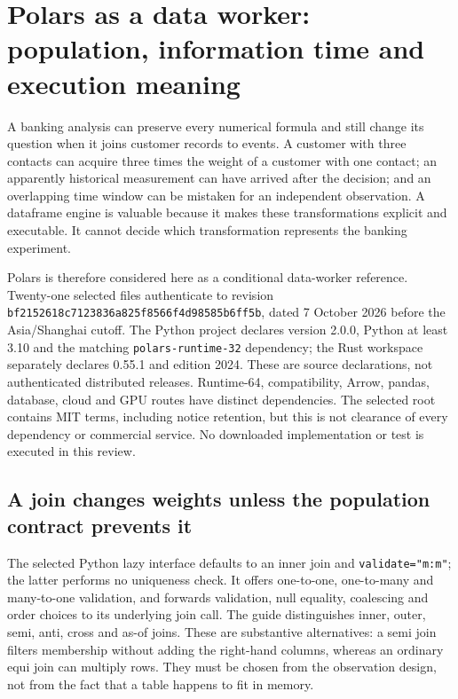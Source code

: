 \section{Polars as a data worker: population, information time and execution meaning}
\label{sec:exec23-polars-worker}

A banking analysis can preserve every numerical formula and still change its
question when it joins customer records to events. A customer with three
contacts can acquire three times the weight of a customer with one contact;
an apparently historical measurement can have arrived after the decision;
and an overlapping time window can be mistaken for an independent
observation. A dataframe engine is valuable because it makes these
transformations explicit and executable. It cannot decide which
transformation represents the banking experiment.

Polars is therefore considered here as a conditional data-worker reference.
Twenty-one selected files authenticate to revision
\texttt{bf2152618c7123836a825f8566f4d98585b6ff5b}, dated 7 October 2026 before
the Asia/Shanghai cutoff. The Python project declares version 2.0.0,
Python at least 3.10 and the matching \texttt{polars-runtime-32} dependency;
the Rust workspace separately declares 0.55.1 and edition 2024. These are
source declarations, not authenticated distributed releases. Runtime-64,
compatibility, Arrow, pandas, database, cloud and GPU routes have distinct
dependencies. The selected root contains MIT terms, including notice
retention, but this is not clearance of every dependency or commercial
service. No downloaded implementation or test is executed in this review.
\citep{exec23_polars_sources}

\subsection{A join changes weights unless the population contract prevents it}

The selected Python lazy interface defaults to an inner join and
\texttt{validate="m:m"}; the latter performs no uniqueness check. It offers
one-to-one, one-to-many and many-to-one validation, and forwards validation,
null equality, coalescing and order choices to its underlying join call.
The guide distinguishes inner, outer, semi, anti, cross and as-of joins.
These are substantive alternatives: a semi join filters membership without
adding the right-hand columns, whereas an ordinary equi join can multiply
rows. They must be chosen from the observation design, not from the fact
that a table happens to fit in memory.~\citep{exec23_polars_sources}

